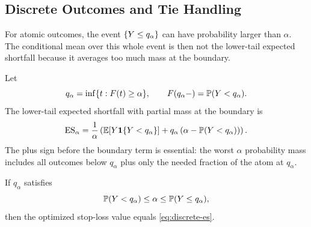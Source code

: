 \subsection{Discrete Outcomes and Tie Handling}
\label{app:discrete}

For atomic outcomes, the event $\{Y\le q_\alpha\}$ can have probability
larger than $\alpha$. The conditional mean over this whole event is then not
the lower-tail expected shortfall because it averages too much mass at the
boundary.

Let
\[
q_\alpha=\inf\{t:F(t)\ge\alpha\},
\qquad
F(q_\alpha-)=\mathbb{P}(Y<q_\alpha).
\]
The lower-tail expected shortfall with partial mass at the boundary is
\begin{equation}
\mathrm{ES}_{\alpha}
=\frac{1}{\alpha}\left(
\mathbb{E}[Y\mathbf{1}\{Y<q_\alpha\}]
+q_\alpha\left(\alpha-\mathbb{P}(Y<q_\alpha)\right)
\right).
\label{eq:discrete-es}
\end{equation}
The plus sign before the boundary term is essential: the worst
$\alpha$ probability mass includes all outcomes below $q_\alpha$ plus only the
needed fraction of the atom at $q_\alpha$.

\begin{proposition}
\label{prop:formal-discrete-stoploss}
If $q_\alpha$ satisfies
\[
\mathbb{P}(Y<q_\alpha)\le\alpha\le\mathbb{P}(Y\le q_\alpha),
\]
then the optimized stop-loss value equals \cref{eq:discrete-es}.
\end{proposition}

\begin{twocolproof}
\end{twocolproof}


